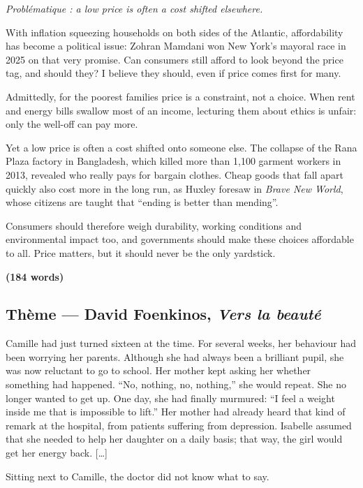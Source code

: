 \documentclass[11pt,a4paper]{article}
\begin{document}
\emph{Problématique : a low price is often a cost shifted elsewhere.}

With inflation squeezing households on both sides of the Atlantic, affordability has become a political issue: Zohran Mamdani won New York's mayoral race in 2025 on that very promise. Can consumers still afford to look beyond the price tag, and should they? I believe they should, even if price comes first for many.

Admittedly, for the poorest families price is a constraint, not a choice. When rent and energy bills swallow most of an income, lecturing them about ethics is unfair: only the well-off can pay more.

Yet a low price is often a cost shifted onto someone else. The collapse of the Rana Plaza factory in Bangladesh, which killed more than 1,100 garment workers in 2013, revealed who really pays for bargain clothes. Cheap goods that fall apart quickly also cost more in the long run, as Huxley foresaw in \emph{Brave New World}, whose citizens are taught that ``ending is better than mending''.

Consumers should therefore weigh durability, working conditions and environmental impact too, and governments should make these choices affordable to all. Price matters, but it should never be the only yardstick.

\textbf{(184 words)}

\hypertarget{thuxe8me-david-foenkinos-vers-la-beautuxe9}{%
\subsection{\texorpdfstring{Thème --- David Foenkinos, \emph{Vers la beauté}}{Thème --- David Foenkinos, Vers la beauté}}\label{thuxe8me-david-foenkinos-vers-la-beautuxe9}}

Camille had just turned sixteen at the time. For several weeks, her behaviour had been worrying her parents. Although she had always been a brilliant pupil, she was now reluctant to go to school. Her mother kept asking her whether something had happened. ``No, nothing, no, nothing,'' she would repeat. She no longer wanted to get up. One day, she had finally murmured: ``I feel a weight inside me that is impossible to lift.'' Her mother had already heard that kind of remark at the hospital, from patients suffering from depression. Isabelle assumed that she needed to help her daughter on a daily basis; that way, the girl would get her energy back. {[}\ldots{]}

Sitting next to Camille, the doctor did not know what to say.
\end{document}
